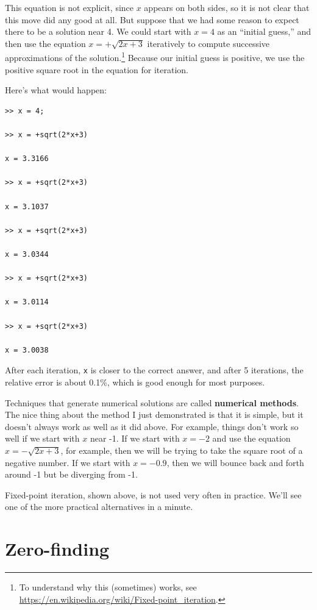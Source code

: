\documentclass[
]{book}
\begin{document}
This equation is not explicit, since $x$ appears on both sides, so
it is not clear that this move did any good at all.  But suppose
that we had some reason to expect there to be a solution near 4.
We could start with $x=4$ as an ``initial guess,'' and then use
the equation $x = + \sqrt{2x+3}$ iteratively to compute successive
approximations of the solution.\footnote{To understand why this
(sometimes) works, see
\url{https://en.wikipedia.org/wiki/Fixed-point_iteration}.}
Because our initial guess is positive, we use the positive square root in the equation for iteration.  

Here's what would happen:

\begin{verbatim}
>> x = 4;

>> x = +sqrt(2*x+3)

x = 3.3166

>> x = +sqrt(2*x+3)

x = 3.1037

>> x = +sqrt(2*x+3)

x = 3.0344

>> x = +sqrt(2*x+3)

x = 3.0114

>> x = +sqrt(2*x+3)

x = 3.0038
\end{verbatim}

After each iteration, {\tt x} is closer to the correct answer,
and after 5 iterations, the relative error is about 0.1\%, which
is good enough for most purposes.

Techniques that generate numerical solutions are called
{\bf numerical methods}.  
The nice thing about the method I
just demonstrated is that it is simple, but it doesn't always
work as well as it did above.
For example, things don't work so well if we start with $x$ near -1. If we start with $x=-2$ and use
the equation $x = - \sqrt{2x+3}$, for example, then we will be trying to take the square root of a negative number.  If we start with $x=-0.9$, then we will bounce back and forth around -1 but be diverging from -1.  

Fixed-point iteration, shown above, is not used
very often in practice.  We'll see one of
the more practical alternatives in a minute.



\section{Zero-finding}
\label{sect:zero}
\end{document}
